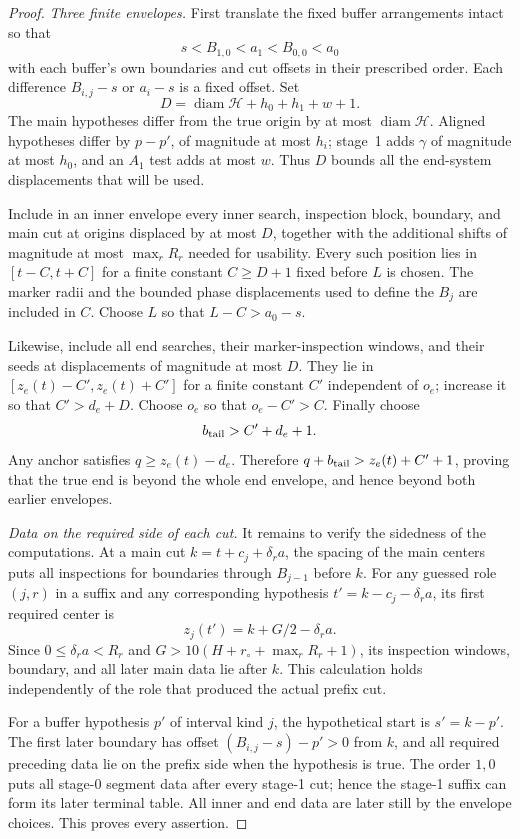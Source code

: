 \begin{proof}
\emph{Three finite envelopes.}
First translate the fixed buffer arrangements intact so that
\[
 s<B_{1,0}<a_1<B_{0,0}<a_0
\]
with each buffer's own boundaries and cut offsets in their prescribed
order.  Each difference $B_{i,j}-s$ or $a_i-s$ is a fixed offset.
Set
\[
 D=\operatorname{diam}\mathcal H+h_0+h_1+w+1.
\]
The main hypotheses differ from the true origin by at most
$\operatorname{diam}\mathcal H$.  Aligned hypotheses differ by
$p-p'$, of magnitude at most $h_i$; stage~1 adds $\gamma$ of magnitude
at most $h_0$, and an $A_1$ test adds at most $w$.  Thus $D$ bounds all
the end-system displacements that will be used.

Include in an inner envelope every inner search, inspection block,
boundary, and main cut at origins displaced by at most $D$, together with
the additional shifts of magnitude at most $\max_r R_r$ needed for
usability.  Every such position lies in $[t-C,t+C]$ for a finite constant
$C\ge D+1$ fixed before $L$ is chosen.  The marker radii and the bounded phase
displacements used to define the $B_j$ are included in $C$.  Choose $L$
so that $L-C>a_0-s$.

Likewise, include all end searches, their marker-inspection windows, and
their seeds at displacements of magnitude at most $D$.  They lie in
$[z_e(t)-C',z_e(t)+C']$ for a finite constant $C'$ independent of $o_e$;
increase it so that $C'>d_e+D$.  Choose $o_e$ so that $o_e-C'>C$.
Finally choose
\[
 b_{\rm tail}>C'+d_e+1.
\]
Any anchor satisfies $q\ge z_e(t)-d_e$.  Therefore
$q+b_{\rm tail}>z_e(t)+C'+1$, proving that the true end is beyond the
whole end envelope, and hence beyond both earlier envelopes.

\emph{Data on the required side of each cut.}
It remains to verify the sidedness of the computations.  At a main cut
$k=t+c_j+\delta_r a$, the spacing of the main centers puts all
inspections for boundaries through $B_{j-1}$ before $k$.  For any
guessed role $(j,r)$ in a suffix and any corresponding hypothesis
$t'=k-c_j-\delta_r a$, its first required center is
\[
 z_j(t')=k+G/2-\delta_r a.
\]
Since $0\le\delta_r a<R_r$ and
$G>10(H+r_\circ+\max_r R_r+1)$, its inspection windows, boundary, and
all later main data lie after $k$.  This calculation holds independently
of the role that produced the actual prefix cut.

For a buffer hypothesis $p'$ of interval kind $j$, the hypothetical
start is $s'=k-p'$.  The first later boundary has offset
$(B_{i,j}-s)-p'>0$ from $k$, and all required preceding data lie on the
prefix side when the hypothesis is true.  The order $1,0$ puts all
stage-0 segment data after every stage-1 cut; hence the stage-1 suffix can
form its later terminal table.  All inner and end data are later still
by the envelope choices.  This proves every assertion.
\end{proof}

